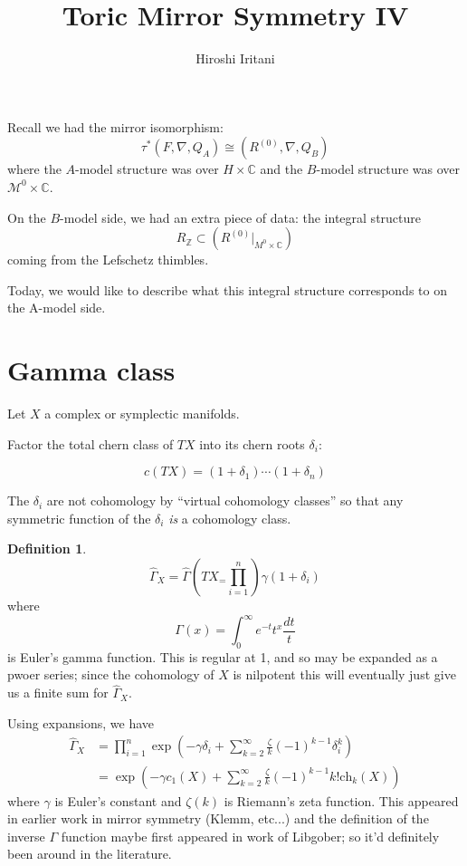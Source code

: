 \documentclass{amsart}
\author{Hiroshi Iritani}
\title{Toric Mirror Symmetry IV}
\theoremstyle{definition}
\newtheorem{definition}[dummy]{Definition}
\newcommand{\Z}{\mathbb{Z}}
\newcommand{\M}{\mathcal{M}}
\newcommand{\C}{\mathbb{C}}
\begin{document}
\maketitle

Recall we had the mirror isomorphism: 
$$\tau^*(F, \nabla, Q_A)\cong(R^{(0)},\nabla, Q_B)$$
where the $A$-model structure was over $H\times\C$ and the $B$-model structure was over $\M^0\times \C$.

On the $B$-model side, we had an extra piece of data: the integral structure 
$$R_\Z\subset \left(R^{(0)}|_{M^0\times\C}\right)$$ coming from the Lefschetz thimbles.

Today, we would like to describe what this integral structure corresponds to on the A-model side.

\section{Gamma class}

Let $X$ a complex or symplectic manifolds.

Factor the total chern class of $TX$ into its chern roots $\delta_i$:

$$c(TX)=(1+\delta_1)\cdots (1+\delta_n)$$

The $\delta_i$ are not cohomology by ``virtual cohomology classes'' so that any symmetric function of the $\delta_i$ \emph{is} a cohomology class.

\begin{definition}
$$\widehat{\Gamma}_X=\widehat{\Gamma}(TX_=\prod_{i=1}^n)\gamma(1+\delta_i)$$
where
$$\Gamma(x)=\int_0^\infty e^{-t} t^x\frac{dt}{t}$$
is Euler's gamma function.  This is regular at 1, and so may be expanded as a pwoer series; since the cohomology of $X$ is nilpotent this will eventually just give us a finite sum for $\widehat{\Gamma}_X$.





\end{definition}
Using expansions, we have
\begin{align*}
\widehat{\Gamma}_X&=\prod_{i=1}^n\exp\left(-\gamma\delta_i+\sum_{k=2}^\infty \frac{\zeta}{k}(-1)^{k-1}\delta_i^k\right)\\
&= \exp\left(-\gamma c_1(X)+\sum_{k=2}^\infty\frac{\zeta}{k}(-1)^{k-1}k!\text{ch}_k(X)\right)
\end{align*}
where $\gamma$ is Euler's constant and $\zeta(k)$ is Riemann's zeta function.  This appeared in earlier work in mirror symmetry (Klemm, etc...) and the definition of the inverse $\Gamma$ function maybe first appeared in work of Libgober; so it'd definitely been around in the literature.
\end{document}

